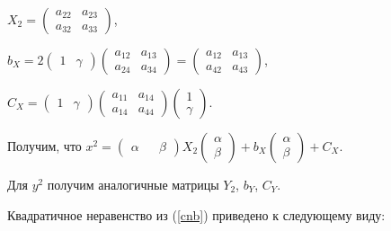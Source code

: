 \documentclass[pdftex,ptm,12pt,a4paper]{report}
\begin{document}
        $X_2 = \begin{pmatrix} 
              a_{22} & a_{23} \\ 
              a_{32} & a_{33} 
        \end{pmatrix}$, 

        $b_X = 2\begin{pmatrix} 1 & \gamma \end{pmatrix} 
          \begin{pmatrix} 
              a_{12} & a_{13} \\ 
              a_{24} & a_{34} 
        \end{pmatrix} = 
        \begin{pmatrix} 
              a_{12} & a_{13} \\ 
              a_{42} & a_{43} 
        \end{pmatrix}$,

        $C_X = \begin{pmatrix} 1 & \gamma \end{pmatrix} 
          \begin{pmatrix} 
              a_{11} & a_{14} \\ 
              a_{14} & a_{44} 
        \end{pmatrix}
        \begin{pmatrix} 1 \\ \gamma \end{pmatrix}$.

      Получим, что 
      $x^2 = \begin{pmatrix} \alpha && \beta \end{pmatrix}
               X_2
             \begin{pmatrix} \alpha \\ \beta \end{pmatrix} +
             b_X \begin{pmatrix} \alpha \\ \beta \end{pmatrix}  +
             C_X$.

      Для $y^2$ получим аналогичные матрицы $Y_2$, $b_Y$, $C_Y$.

      Квадратичное неравенство из (\ref{cnb}) приведено к следующему виду:
\end{document}
